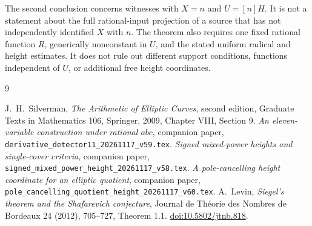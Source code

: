 \documentclass[11pt,a4paper]{article}
\begin{document}
The second conclusion concerns witnesses with $X=n$ and
$U=[n]H$. It is not a statement about the full rational-input
projection of a source that has not independently identified
$X$ with $n$. The theorem also requires one fixed rational
function $R$, generically nonconstant in $U$, and the stated
uniform radical and height estimates. It does not rule out
different support conditions, functions independent of $U$,
or additional free height coordinates.

\begin{thebibliography}{9}
\raggedright
{}J.~H.~Silverman, \emph{The Arithmetic of Elliptic Curves},
second edition, Graduate Texts in Mathematics 106, Springer, 2009,
Chapter VIII, Section 9.
\emph{An eleven-variable construction under rational $abc$}, companion paper, \nolinkurl{derivative_detector11_20261117_v59.tex}.
\emph{Signed mixed-power heights and single-cover
criteria}, companion paper, \nolinkurl{signed_mixed_power_height_20261117_v58.tex}.
\emph{A pole-cancelling height coordinate for an
elliptic quotient}, companion paper,
\nolinkurl{pole_cancelling_quotient_height_20261117_v60.tex}.
A.~Levin, \emph{Siegel's theorem and the Shafarevich
conjecture}, Journal de Th\'eorie des Nombres de Bordeaux 24 (2012),
705--727, Theorem 1.1. \href{https://doi.org/10.5802/jtnb.818}{doi:10.5802/jtnb.818}.
\end{thebibliography}
\end{document}
